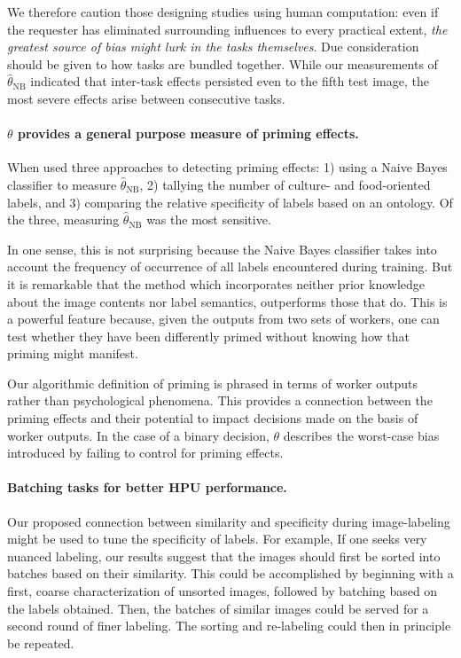 \documentclass[letterpaper,twocolumn]{article}
\begin{document}
We therefore caution those designing studies using human computation: even if 
the requester has eliminated surrounding influences to every practical extent, 
\textit{the greatest source of bias might lurk in the tasks themselves}.
Due consideration should be given to how tasks are bundled together.
While our measurements of $\hat{\theta}_\text{NB}$ indicated that inter-task 
effects persisted even to the fifth test image, the most severe effects arise 
between consecutive tasks.

\paragraph{$\theta$ provides a general purpose measure of priming effects.}
When used three approaches to detecting priming effects: 1) using a Naive Bayes
classifier to measure $\hat{\theta}_\text{NB}$, 2) tallying the number of 
culture- and food-oriented labels, and 3) comparing the relative specificity
of labels based on an ontology.  Of the three, measuring $
\hat{\theta}_\text{NB}$ was the most sensitive.  

In one sense, this is not surprising because the Naive 
Bayes classifier takes into account the frequency of occurrence of all labels 
encountered during training.  But it is remarkable that the 
method which incorporates neither prior knowledge about the image contents nor 
label semantics, outperforms those that do.  This is a powerful feature 
because, given the outputs from two sets of workers, one can test whether they 
have been differently primed without knowing how that priming might manifest.

Our algorithmic definition of priming is phrased in terms of worker outputs
rather than psychological phenomena.  This provides a connection between
the priming effects and their potential to impact decisions made on the basis
of worker outputs.  In the case of a binary decision, $\theta$
describes the worst-case bias introduced by failing to control for priming 
effects.

\paragraph{Batching tasks for better HPU performance.}
Our proposed connection between similarity and specificity during 
image-labeling might be used to tune the specificity of labels.  For example,
If one seeks very nuanced labeling, our results suggest that the images 
should first be sorted into batches based on their similarity. This could be 
accomplished by beginning with a first, coarse characterization of unsorted 
images, followed by batching based on the labels obtained. Then, the batches
of similar images could be served for a second round of finer labeling. 
The sorting and re-labeling could then in principle be repeated.
\end{document}
